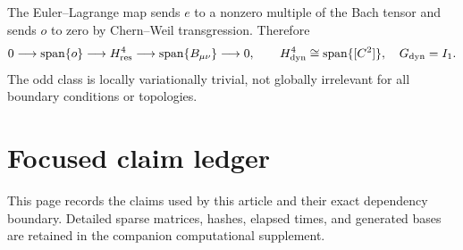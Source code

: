 \documentclass[11pt]{article}
\theoremstyle{remark}
\begin{document}
The Euler--Lagrange map sends $e$ to a nonzero multiple of the Bach tensor
and sends $o$ to zero by Chern--Weil transgression.  Therefore
\begin{equation}\label{eq:dynamical-a}
 0\longrightarrow\operatorname{span}\{o\}
 \longrightarrow H^4_{\rm res}
 \longrightarrow\operatorname{span}\{B_{\mu\nu}\}
 \longrightarrow0,
 \qquad
 H^4_{\rm dyn}\cong\operatorname{span}\{[C^2]\},
 \quad G_{\rm dyn}=I_1.
\end{equation}
The odd class is locally variationally trivial, not globally irrelevant for
all boundary conditions or topologies.

\clearpage
\section{Focused claim ledger}\label{sec:ledger}

This page records the claims used by this article and their exact
dependency boundary.  Detailed sparse matrices, hashes, elapsed times, and
generated bases are retained in the companion computational supplement.
\end{document}
